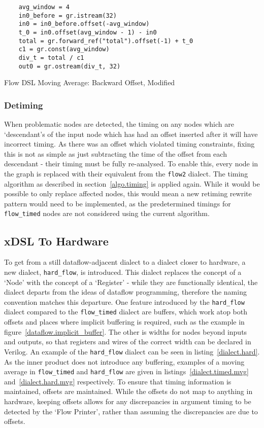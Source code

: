 \renewcommand\theFancyVerbLine{\arabic{FancyVerbLine}}
\begin{listing}[H]
  \begin{verbatim}
    avg_window = 4
    in0_before = gr.istream(32)
    in0 = in0_before.offset(-avg_window)
    t_0 = in0.offset(avg_window - 1) - in0
    total = gr.forward_ref("total").offset(-1) + t_0
    c1 = gr.const(avg_window)
    div_t = total / c1
    out0 = gr.ostream(div_t, 32)
  \end{verbatim}
  \caption{Flow DSL Moving Average: Backward Offset, Modified}\label{mvg_avg.modified}
\end{listing}

\subsubsection{Detiming}
When problematic nodes are detected, the timing on any nodes which are `descendant's of the input node which has had an offset inserted after it will have incorrect timing. As there was an offset which violated timing constraints, fixing this is not as simple as just subtracting the time of the offset from each descendant \hyphen{} their timing must be fully re-analysed. To enable this, every node in the graph is replaced with their equivalent from the \lstinline|flow2| dialect. The timing algorithm as described in section \ref{algo.timing} is applied again. While it would be possible to only replace affected nodes, this would mean a new retiming rewrite pattern would need to be implemented, as the predetermined timings for \lstinline|flow_timed| nodes are not considered using the current algorithm.

\subsection{xDSL To Hardware}
To get from a still dataflow-adjacent dialect to a dialect closer to hardware, a new dialect, \lstinline|hard_flow|, is introduced. This dialect replaces the concept of a `Node' with the concept of a `Register' \hyphen{} while they are functionally identical, the dialect departs from the ideas of dataflow programming, therefore the naming convention matches this departure. One feature introduced by the \lstinline|hard_flow| dialect compared to the \lstinline|flow_timed| dialect are buffers, which work atop both offsets and places where implicit buffering is required, such as the example in figure \ref{dataflow.implicit_buffer}. The other is widths for nodes beyond inputs and outputs, so that registers and wires of the correct width can be declared in Verilog. An example of the \lstinline|hard_flow| dialect can be seen in listing \ref{dialect.hard}. As the inner product does not introduce any buffering, examples of a moving average in \lstinline|flow_timed| and \lstinline|hard_flow| are given in listings \ref{dialect.timed.mvg} and \ref{dialect.hard.mvg} respectively. To ensure that timing information is maintained, offsets are maintained. While the offsets do not map to anything in hardware, keeping offsets allows for any discrepancies in argument timing to be detected by the `Flow Printer', rather than assuming the discrepancies are due to offsets.

